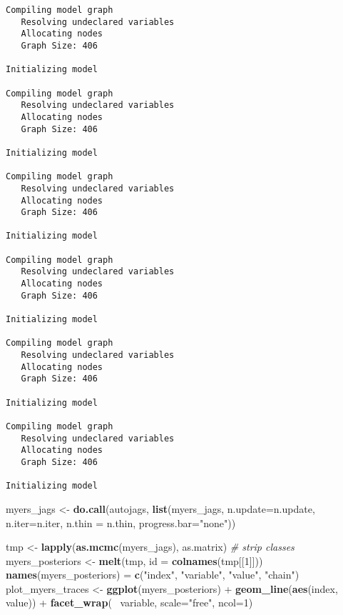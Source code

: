 \documentclass[author-year, review]{elsarticle} %
\newenvironment{Shaded}{}{}
\newcommand{\KeywordTok}[1]{\textcolor[rgb]{0.00,0.44,0.13}{\textbf{{#1}}}}
\newcommand{\DataTypeTok}[1]{\textcolor[rgb]{0.56,0.13,0.00}{{#1}}}
\newcommand{\DecValTok}[1]{\textcolor[rgb]{0.25,0.63,0.44}{{#1}}}
\newcommand{\StringTok}[1]{\textcolor[rgb]{0.25,0.44,0.63}{{#1}}}
\newcommand{\CommentTok}[1]{\textcolor[rgb]{0.38,0.63,0.69}{\textit{{#1}}}}
\newcommand{\NormalTok}[1]{{#1}}
\begin{document}
\begin{verbatim}
Compiling model graph
   Resolving undeclared variables
   Allocating nodes
   Graph Size: 406

Initializing model

Compiling model graph
   Resolving undeclared variables
   Allocating nodes
   Graph Size: 406

Initializing model

Compiling model graph
   Resolving undeclared variables
   Allocating nodes
   Graph Size: 406

Initializing model

Compiling model graph
   Resolving undeclared variables
   Allocating nodes
   Graph Size: 406

Initializing model

Compiling model graph
   Resolving undeclared variables
   Allocating nodes
   Graph Size: 406

Initializing model

Compiling model graph
   Resolving undeclared variables
   Allocating nodes
   Graph Size: 406

Initializing model
\end{verbatim}

\begin{Shaded}
\begin{Highlighting}[]
\NormalTok{myers_jags <- }\KeywordTok{do.call}\NormalTok{(autojags, }
                      \KeywordTok{list}\NormalTok{(myers_jags, }\DataTypeTok{n.update=}\NormalTok{n.update, }
                           \DataTypeTok{n.iter=}\NormalTok{n.iter, }\DataTypeTok{n.thin =} \NormalTok{n.thin, }
                           \DataTypeTok{progress.bar=}\StringTok{"none"}\NormalTok{))}
\end{Highlighting}
\end{Shaded}

\begin{Shaded}
\begin{Highlighting}[]
\NormalTok{tmp <- }\KeywordTok{lapply}\NormalTok{(}\KeywordTok{as.mcmc}\NormalTok{(myers_jags), as.matrix) }\CommentTok{# strip classes}
\NormalTok{myers_posteriors <- }\KeywordTok{melt}\NormalTok{(tmp, }\DataTypeTok{id =} \KeywordTok{colnames}\NormalTok{(tmp[[}\DecValTok{1}\NormalTok{]])) }
\KeywordTok{names}\NormalTok{(myers_posteriors) = }\KeywordTok{c}\NormalTok{(}\StringTok{"index"}\NormalTok{, }\StringTok{"variable"}\NormalTok{, }\StringTok{"value"}\NormalTok{, }\StringTok{"chain"}\NormalTok{)}
\NormalTok{plot_myers_traces <- }\KeywordTok{ggplot}\NormalTok{(myers_posteriors) + }\KeywordTok{geom_line}\NormalTok{(}\KeywordTok{aes}\NormalTok{(index, value)) +}
  \KeywordTok{facet_wrap}\NormalTok{(~ variable, }\DataTypeTok{scale=}\StringTok{"free"}\NormalTok{, }\DataTypeTok{ncol=}\DecValTok{1}\NormalTok{)}
\end{Highlighting}
\end{Shaded}
\end{document}
